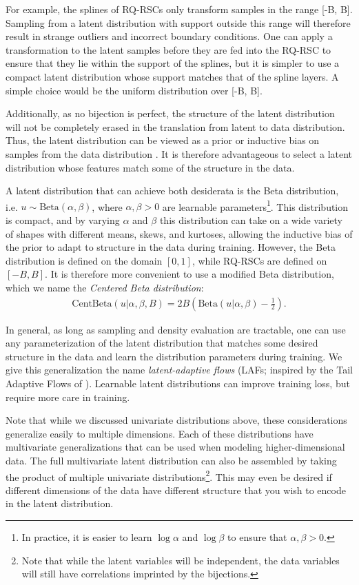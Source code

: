 \documentclass[twocolumn,twocolappendix]{aastex631}
\begin{document}
For example, the splines of RQ-RSCs only transform samples in the range [-B, B].
Sampling from a latent distribution with support outside this range will therefore result in strange outliers and incorrect boundary conditions.
One can apply a transformation to the latent samples before they are fed into the RQ-RSC to ensure that they lie within the support of the splines, but it is simpler to use a compact latent distribution whose support matches that of the spline layers.
A simple choice would be the uniform distribution over [-B, B].

Additionally, as no bijection is perfect, the structure of the latent distribution will not be completely erased in the translation from latent to data distribution.
Thus, the latent distribution can be viewed as a prior or inductive bias on samples from the data distribution \citep{jaini2020}.
It is therefore advantageous to select a latent distribution whose features match some of the structure in the data.

A latent distribution that can achieve both desiderata is the Beta distribution, i.e. $u \sim \mathrm{Beta}(\alpha, \beta)$, where $\alpha, \beta > 0$ are learnable parameters\footnote{In practice, it is easier to learn $\log\alpha$ and $\log\beta$ to ensure that $\alpha, \beta > 0$.}.
This distribution is compact, and by varying $\alpha$ and $\beta$ this distribution can take on a wide variety of shapes with different means, skews, and kurtoses, allowing the inductive bias of the prior to adapt to structure in the data during training.
However, the Beta distribution is defined on the domain $[0, 1]$, while RQ-RSCs are defined on $[-B, B]$.
It is therefore more convenient to use a modified Beta distribution, which we name the \emph{Centered Beta distribution}:
\begin{align}
    \text{CentBeta}(u | \alpha, \beta, B) = 2B\left(\text{Beta}(u|\alpha, \beta) - \frac{1}{2}\right).
\end{align}

In general, as long as sampling and density evaluation are tractable, one can use any parameterization of the latent distribution that matches some desired structure in the data and learn the distribution parameters during training.
We give this generalization the name \emph{latent-adaptive flows} (LAFs; inspired by the Tail Adaptive Flows of \citealt{jaini2020}).
Learnable latent distributions can improve training loss, but require more care in training.

Note that while we discussed univariate distributions above, these considerations generalize easily to multiple dimensions.
Each of these distributions have multivariate generalizations that can be used when modeling higher-dimensional data.
The full multivariate latent distribution can also be assembled by taking the product of multiple univariate distributions\footnote{Note that while the latent variables will be independent, the data variables will still have correlations imprinted by the bijections.}.
This may even be desired if different dimensions of the data have different structure that you wish to encode in the latent distribution.
\end{document}
